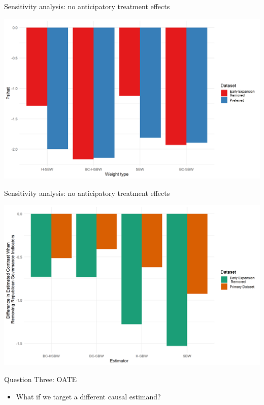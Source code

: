 \documentclass[hyperref={pdfpagelabels=false}]{beamer}
\begin{document}
\begin{frame}{Sensitivity analysis: no anticipatory treatment effects}
    \begin{center}
	\includegraphics[scale=0.5]{01_Plots/point-estimates-sigmai-c1c2-comparison.png}
    \end{center}
\end{frame}

\begin{frame}{Sensitivity analysis: no anticipatory treatment effects}
    \begin{center}
	\includegraphics[scale=0.5]{01_Plots/repub-diff-c1c2.png}
    \end{center}
\end{frame}

\begin{frame}{Question Three: OATE}
    \begin{itemize}
        \item What if we target a different causal estimand?
    \end{itemize}
\end{frame}
\end{document}
